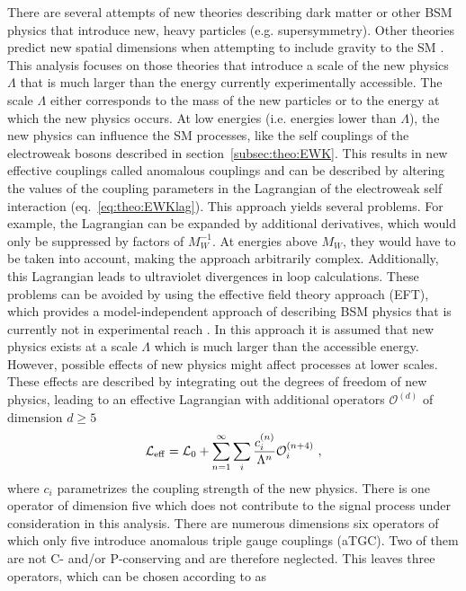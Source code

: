 \noindent There are several attempts of new theories describing dark matter or other BSM physics that introduce new, heavy particles (e.g. supersymmetry). Other theories predict new spatial dimensions when attempting to include gravity to the SM \cite{xdimensions}. This analysis focuses on those theories that introduce a scale of the new physics $\Lambda$ that is much larger than the energy currently experimentally accessible. The scale $\Lambda$ either corresponds to the mass of the new particles or to the energy at which the new physics occurs. At low energies (i.e. energies lower than $\Lambda$), the new physics can influence the SM processes, like the self couplings of the electroweak bosons described in section~\ref{subsec:theo:EWK}. This results in new effective couplings called anomalous couplings and can be described by altering the values of the coupling parameters in the Lagrangian of the electroweak self interaction (eq.~\ref{eq:theo:EWKlag}). This approach yields several problems. For example, the Lagrangian can be expanded by additional derivatives, which would only be suppressed by factors of $M_W^{-1}$. At energies above $M_W$, they would have to be taken into account, making the approach arbitrarily complex. Additionally, this Lagrangian leads to ultraviolet divergences in loop calculations. These problems can be avoided by using the effective field theory approach (EFT), which provides a model-independent approach of describing BSM physics that is currently not in experimental reach \cite{EFT}. In this approach it is assumed that new physics exists at a scale $\Lambda$ which is much larger than the accessible energy. However, possible effects of new physics might affect processes at lower scales. These effects are described by integrating out the degrees of freedom of new physics, leading to an effective Lagrangian with additional operators $\mathcal{O}^{(d)}$ of dimension $d\geq 5$
\begin{equation}
\mathcal{L}_{\rm eff} = \mathcal{L}_0 + \sum_{n=1}^{\infty} \sum_i \frac{c_i^{(n)}}{\Lambda^{n}}\mathcal{O}_i^{(n+4)} ~, \label{eq:theo:operators}
\end{equation}
where $c_i$ parametrizes the coupling strength of the new physics. There is one operator of dimension five which does not contribute to the signal process under consideration in this analysis. There are numerous dimensions six operators of which only five introduce anomalous triple gauge couplings (aTGC). Two of them are not C- and/or P-conserving and are therefore neglected. This leaves three operators, which can be chosen according to \cite{EFTparam} as
